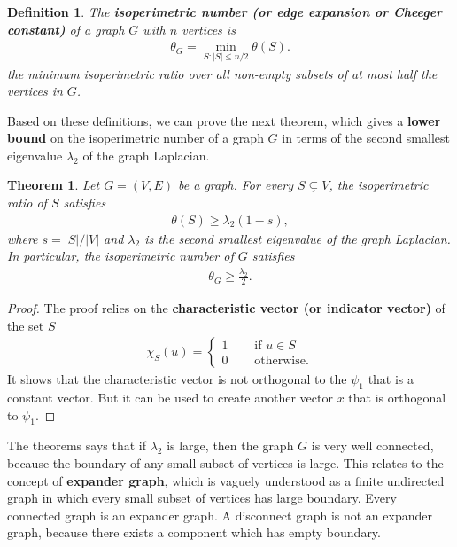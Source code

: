 \documentclass[]{article}
\newtheorem{theorem}{Theorem}[section]
\newtheorem{definition}{Definition}[section] %
\begin{document}
	\begin{definition}
		The \textbf{isoperimetric number (or edge expansion or Cheeger constant)} of a graph $G$ with $n$ vertices is  
		\begin{align*}
		\theta_G = \min_{S:|S|\le n/2} \theta(S).
		\end{align*}
		the minimum isoperimetric ratio over all non-empty subsets of at most half the vertices in $G$.
	\end{definition}
	
	Based on these definitions, we can prove the next theorem, which gives a \textbf{lower bound} on the isoperimetric number of a graph $G$ in terms of the second smallest eigenvalue $\lambda_2$ of the graph Laplacian. 
	\begin{theorem}
		Let $G=(V,E)$ be a graph. For every $S \subsetneq V$, the isoperimetric ratio of $S$ satisfies 
		\begin{align*}
		\theta(S) \ge \lambda_2(1-s),
		\end{align*}
		where $s=|S|/|V|$ and $\lambda_2$ is the second smallest eigenvalue of the graph Laplacian. In particular, the isoperimetric number of $G$ satisfies 
		\begin{align*}
		\theta_G \ge \frac{\lambda_2}{2}.
		\end{align*}
	\end{theorem}
	\begin{proof}
		The proof relies on the \textbf{characteristic vector (or indicator vector)} of the set $S$ 
		\begin{align*}
		\chi_S(u) = 
		\begin{cases}
		1 & \quad \text{ if } u \in S\\
		0 & \quad \text{ otherwise.}
		\end{cases}
		\end{align*}
		It shows that the characteristic vector is not orthogonal to the $\psi_1$ that is a constant vector. But it can be used to create another vector $x$ that is orthogonal to $\psi_1$. 
	\end{proof}
	The theorems says that if $\lambda_2$ is large, then the graph $G$ is very well connected, because the boundary of any small subset of vertices is large. This relates to the concept of \textbf{expander graph}, which is vaguely understood as a finite undirected graph in which every small subset of vertices has large boundary. Every connected graph is an expander graph. A disconnect graph is not an expander graph, because there exists a component which has empty boundary. 
	
\end{document}
